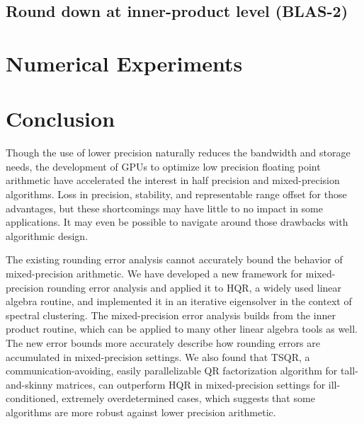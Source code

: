 \documentclass[review,onefignum,onetabnum]{siamart190516}
\begin{document}
\subsection{Round down at inner-product level (BLAS-2)}
\section{Numerical Experiments}\label{sec:NE}

%
%
%
%
%

\section{Conclusion}
Though the use of lower precision naturally reduces the bandwidth and storage needs, the development of GPUs to optimize low precision floating point arithmetic have accelerated the interest in half precision and mixed-precision algorithms. 
Loss in precision, stability, and representable range offset for those advantages, but these shortcomings may have little to no impact in some applications.
It may even be possible to navigate around those drawbacks with algorithmic design. \par 

The existing rounding error analysis cannot accurately bound the behavior of mixed-precision arithmetic.
We have developed a new framework for mixed-precision rounding error analysis and applied it to HQR, a widely used linear algebra routine, and implemented it in an iterative eigensolver in the context of spectral clustering. 
The mixed-precision error analysis builds from the inner product routine, which can be applied to many other linear algebra tools as well.
The new error bounds more accurately describe how rounding errors are accumulated in mixed-precision settings.
We also found that TSQR, a communication-avoiding, easily parallelizable QR factorization algorithm for tall-and-skinny matrices, can outperform HQR in mixed-precision settings for ill-conditioned, extremely overdetermined cases, which suggests that some algorithms are more robust against lower precision arithmetic.
\end{document}
